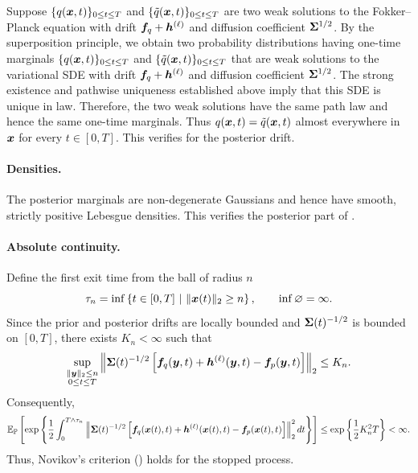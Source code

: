 Suppose $\{q(\boldsymbol{x}, t)\}_{0 \leq t \leq T}$ and $\{\tilde{q}(\boldsymbol{x}, t)\}_{0 \leq t \leq T}$ are two weak solutions to the Fokker--Planck equation with drift $\boldsymbol{f}_q + \boldsymbol{h}^{(\ell)}$ and diffusion coefficient $\boldsymbol{\Sigma}^{1/2}$. 
By the superposition principle, we obtain two probability distributions having one-time marginals $\{q(\boldsymbol{x}, t)\}_{0 \leq t \leq T}$ and $\{\tilde{q}(\boldsymbol{x}, t)\}_{0 \leq t \leq T}$ that are weak solutions to the variational SDE  with drift $\boldsymbol{f}_q + \boldsymbol{h}^{(\ell)}$ and diffusion coefficient $\boldsymbol{\Sigma}^{1/2}$.
The strong existence and pathwise uniqueness established above imply that this SDE is unique in law.
Therefore, the two weak solutions have the same path law and hence the same one-time marginals. 
Thus $q(\boldsymbol{x},t)=\tilde q(\boldsymbol{x},t)$ almost everywhere in $\boldsymbol{x}$ for every $t\in[0,T]$.
This verifies  for the posterior drift.

\paragraph{Densities.}
The posterior marginals are non-degenerate Gaussians and hence have smooth, strictly positive Lebesgue densities. 
This verifies the posterior part of
.

\paragraph{Absolute continuity.}
Define the first exit time from the ball of radius $n$
\begin{equation*}
    \tau_n  = \inf\left\{t\in[0,T] \ | \  \|\boldsymbol{x}(t)\|_2\geq n \right\}, \qquad \inf\varnothing=\infty.
\end{equation*}
Since the prior and posterior drifts are locally bounded and $\boldsymbol{\Sigma}(t)^{-1/2}$ is bounded on $[0,T]$, there exists $K_n<\infty$ such that
\begin{equation*}
    \sup_{\substack{\|\boldsymbol{y}\|_2\leq n\\0\leq t\leq T}} \left\| \boldsymbol{\Sigma}(t)^{-1/2} \left[ \boldsymbol{f}_q(\boldsymbol{y},t)+\boldsymbol{h}^{(\ell)}(\boldsymbol{y},t) -\boldsymbol{f}_p(\boldsymbol{y},t) \right] \right\|_2 \leq K_n.
\end{equation*}
Consequently,
{\small
\begin{equation*}
\begin{aligned}
    \mathbb{E}_{\mathbb{P}}\left[ \exp\left\{ \frac{1}{2} \int_0^{T\wedge\tau_n} \left\| \boldsymbol{\Sigma}(t)^{-1/2} \left[ \boldsymbol{f}_q(\boldsymbol{x}(t),t) +\boldsymbol{h}^{(\ell)}(\boldsymbol{x}(t),t) -\boldsymbol{f}_p(\boldsymbol{x}(t),t) \right] \right\|_2^2dt \right\} \right]  \leq  \exp\left\{\frac{1}{2}K_n^2T\right\} <\infty.
\end{aligned}
\end{equation*}
}
Thus, Novikov's criterion (\citet[Corollary~3.5.13]{karatzas2014brownian}) holds for the stopped process.

